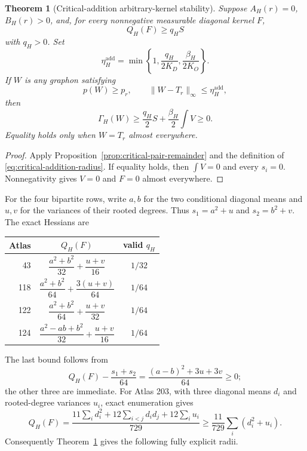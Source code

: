\documentclass[11pt]{article}
\newtheorem{theorem}{Theorem}[section]
\begin{document}
\begin{theorem}[Critical-addition arbitrary-kernel stability]
\label{thm:critical-addition-local}
Suppose $A_H(r)=0$, $B_H(r)>0$, and, for every nonnegative measurable
diagonal kernel $F$,
\[
 Q_H(F)\geq q_HS
\]
with $q_H>0$.  Set
\begin{equation}
 \eta_H^{\mathrm{add}}
 =\min\left\{1,\frac{q_H}{2K_D},
                    \frac{\beta_H}{2K_O}\right\}.
 \label{eq:critical-addition-radius}
\end{equation}
If $W$ is any graphon satisfying
\[
 p(W)\geq p_r,
 \qquad \lVert W-T_r\rVert_\infty
       \leq\eta_H^{\mathrm{add}},
\]
then
\begin{equation}
 \Gamma_H(W)\geq\frac{q_H}{2}S
       +\frac{\beta_H}{2}\int V\geq0.
 \label{eq:critical-addition-bound}
\end{equation}
Equality holds only when $W=T_r$ almost everywhere.
\end{theorem}

\begin{proof}
Apply Proposition~\ref{prop:critical-pair-remainder} and the definition of
\eqref{eq:critical-addition-radius}.  If equality holds, then
$\int V=0$ and every $s_i=0$.  Nonnegativity gives $V=0$ and $F=0$ almost
everywhere.
\end{proof}

For the four bipartite rows, write $a,b$ for the two conditional diagonal
means and $u,v$ for the variances of their rooted degrees.  Thus
$s_1=a^2+u$ and $s_2=b^2+v$.  The exact Hessians are
\begin{center}
\begin{tabular}{r|c|c}
Atlas&$Q_H(F)$&valid $q_H$\\ \hline
43&$\dfrac{a^2+b^2}{32}+\dfrac{u+v}{16}$&$1/32$\\[4pt]
118&$\dfrac{a^2+b^2}{64}+\dfrac{3(u+v)}{64}$&$1/64$\\[4pt]
122&$\dfrac{a^2+b^2}{64}+\dfrac{u+v}{32}$&$1/64$\\[4pt]
124&$\dfrac{a^2-ab+b^2}{32}+\dfrac{u+v}{16}$&$1/64$
\end{tabular}
\end{center}
The last bound follows from
\[
 Q_H(F)-\frac{s_1+s_2}{64}
 =\frac{(a-b)^2+3u+3v}{64}\geq0;
\]
the other three are immediate.  For Atlas 203, with three diagonal means
$d_i$ and rooted-degree variances $u_i$, exact enumeration gives
\[
 Q_H(F)=\frac{11\sum_i d_i^2
 +12\sum_{i<j}d_id_j+12\sum_i u_i}{729}
 \geq\frac{11}{729}\sum_i(d_i^2+u_i).
\]
Consequently Theorem~\ref{thm:critical-addition-local} gives the following
fully explicit radii.
\end{document}
